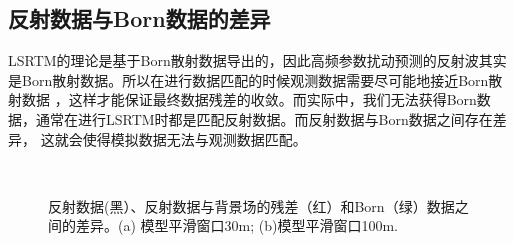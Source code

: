 \subsection{反射数据与Born数据的差异}
LSRTM的理论是基于Born散射数据导出的，因此高频参数扰动预测的反射波其实是Born散射数据。所以在进行数据匹配的时候观测数据需要尽可能地接近Born散射数据
，这样才能保证最终数据残差的收敛。而实际中，我们无法获得Born数据，通常在进行LSRTM时都是匹配反射数据。而反射数据与Born数据之间存在差异，
这就会使得模拟数据无法与观测数据匹配。
\begin{figure}
   \centering
   \\
   \caption{反射数据(黑）、反射数据与背景场的残差（红）和Born（绿）数据之间的差异。(a)
   模型平滑窗口30m; (b)模型平滑窗口100m.}
   \label{fig:refl_born_comparison}
\end{figure}
